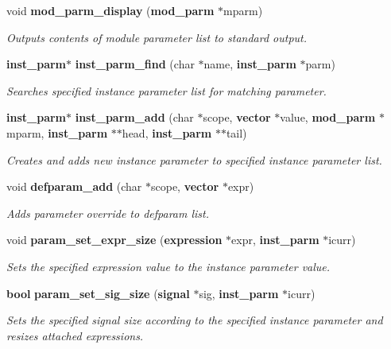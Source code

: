 \begin{CompactItemize}
void {\bf mod\_\-parm\_\-display} ({\bf mod\_\-parm} $\ast$mparm)
\begin{CompactList}\small\item\em Outputs contents of module parameter list to standard output.\item\end{CompactList}\item 
{\bf inst\_\-parm}$\ast$ {\bf inst\_\-parm\_\-find} (char $\ast$name, {\bf inst\_\-parm} $\ast$parm)
\begin{CompactList}\small\item\em Searches specified instance parameter list for matching parameter.\item\end{CompactList}\item 
{\bf inst\_\-parm}$\ast$ {\bf inst\_\-parm\_\-add} (char $\ast$scope, {\bf vector} $\ast$value, {\bf mod\_\-parm} $\ast$mparm, {\bf inst\_\-parm} $\ast$$\ast$head, {\bf inst\_\-parm} $\ast$$\ast$tail)
\begin{CompactList}\small\item\em Creates and adds new instance parameter to specified instance parameter list.\item\end{CompactList}\item 
void {\bf defparam\_\-add} (char $\ast$scope, {\bf vector} $\ast$expr)
\begin{CompactList}\small\item\em Adds parameter override to defparam list.\item\end{CompactList}\item 
void {\bf param\_\-set\_\-expr\_\-size} ({\bf expression} $\ast$expr, {\bf inst\_\-parm} $\ast$icurr)
\begin{CompactList}\small\item\em Sets the specified expression value to the instance parameter value.\item\end{CompactList}\item 
{\bf bool} {\bf param\_\-set\_\-sig\_\-size} ({\bf signal} $\ast$sig, {\bf inst\_\-parm} $\ast$icurr)
\begin{CompactList}\small\item\em Sets the specified signal size according to the specified instance parameter and resizes attached expressions.\item\end{CompactList}\item 

\end{CompactItemize}

